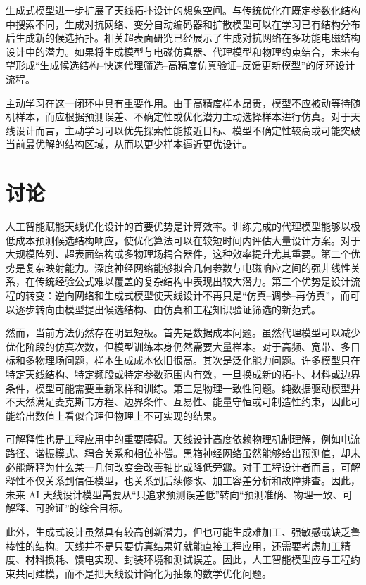 \documentclass[UTF8,a4paper,12pt]{ctexart}
\begin{document}
生成式模型进一步扩展了天线拓扑设计的想象空间。与传统优化在既定参数化结构中搜索不同，生成对抗网络、变分自动编码器和扩散模型可以在学习已有结构分布后生成新的候选拓扑。相关超表面研究已经展示了生成对抗网络在多功能电磁结构设计中的潜力\cite{an2021gan}。如果将生成模型与电磁仿真器、代理模型和物理约束结合，未来有望形成“生成候选结构--快速代理筛选--高精度仿真验证--反馈更新模型”的闭环设计流程。

主动学习在这一闭环中具有重要作用。由于高精度样本昂贵，模型不应被动等待随机样本，而应根据预测误差、不确定性或优化潜力主动选择样本进行仿真。对于天线设计而言，主动学习可以优先探索性能接近目标、模型不确定性较高或可能突破当前最优解的结构区域，从而以更少样本逼近更优设计。

\section{讨论}

人工智能赋能天线优化设计的首要优势是计算效率。训练完成的代理模型能够以极低成本预测候选结构响应，使优化算法可以在较短时间内评估大量设计方案。对于大规模阵列、超表面结构或多物理场耦合器件，这种效率提升尤其重要。第二个优势是复杂映射能力。深度神经网络能够拟合几何参数与电磁响应之间的强非线性关系，在传统经验公式难以覆盖的复杂结构中表现出较大潜力。第三个优势是设计流程的转变：逆向网络和生成式模型使天线设计不再只是“仿真--调参--再仿真”，而可以逐步转向由模型提出候选结构、由仿真和工程知识验证筛选的新范式。

然而，当前方法仍然存在明显短板。首先是数据成本问题。虽然代理模型可以减少优化阶段的仿真次数，但模型训练本身仍然需要大量样本。对于高频、宽带、多目标和多物理场问题，样本生成成本依旧很高。其次是泛化能力问题。许多模型只在特定天线结构、特定频段或特定参数范围内有效，一旦换成新的拓扑、材料或边界条件，模型可能需要重新采样和训练。第三是物理一致性问题。纯数据驱动模型并不天然满足麦克斯韦方程、边界条件、互易性、能量守恒或可制造性约束，因此可能给出数值上看似合理但物理上不可实现的结果。

可解释性也是工程应用中的重要障碍。天线设计高度依赖物理机制理解，例如电流路径、谐振模式、耦合关系和相位补偿。黑箱神经网络虽然能够给出预测值，却未必能解释为什么某一几何改变会改善轴比或降低旁瓣。对于工程设计者而言，可解释性不仅关系到信任模型，也关系到后续修改、加工容差分析和故障排查。因此，未来 AI 天线设计模型需要从“只追求预测误差低”转向“预测准确、物理一致、可解释、可验证”的综合目标。

此外，生成式设计虽然具有较高创新潜力，但也可能生成难加工、强敏感或缺乏鲁棒性的结构。天线并不是只要仿真结果好就能直接工程应用，还需要考虑加工精度、材料损耗、馈电实现、封装环境和测试误差。因此，人工智能模型应与工程约束共同建模，而不是把天线设计简化为抽象的数学优化问题。
\end{document}
